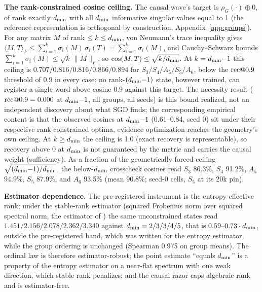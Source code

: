 \textbf{The rank-constrained cosine ceiling.} The causal wave's target
is $\rho_G(\cdot) \oplus 0$, of rank exactly $d_{\min}$ with all $d_{\min}$
informative singular values equal to 1 (the reference representation is
orthogonal by construction, Appendix~\ref{app:groups}). For any matrix
$M$ of rank $\leq k \leq d_{\min}$, von Neumann's trace inequality gives
$\langle M, T\rangle_F \leq \sum_{i=1}^{k} \sigma_i(M)\,\sigma_i(T) =
\sum_{i=1}^{k} \sigma_i(M)$, and Cauchy--Schwarz bounds
$\sum_{i=1}^{k} \sigma_i(M) \leq \sqrt{k}\,\lVert M \rVert_F$, so
$\cos(M, T) \leq \sqrt{k/d_{\min}}$. At $k = d_{\min}{-}1$ this ceiling is
$0.707/0.816/0.816/0.866/0.894$ for $S_3/S_4/A_5/S_5/A_6$, below the
$\mathrm{rec}@0.9$ threshold of 0.9 in every case: no rank-$(d_{\min}{-}1)$
state, however trained, can register a single word above cosine 0.9
against this target. The necessity result ($\mathrm{rec}@0.9 = 0.000$ at
$d_{\min}{-}1$, all groups, all seeds) is this bound realized, not an
independent discovery about what SGD finds; the corresponding empirical
content is that the observed cosines at $d_{\min}{-}1$ (0.61--0.84, seed 0) sit
under their respective rank-constrained optima, evidence optimization
reaches the geometry's own ceiling. At $k \geq d_{\min}$ the ceiling is
1.0 (exact recovery is representable), so recovery above 0 at $d_{\min}$
is not guaranteed by the metric and carries the causal weight
(sufficiency).
As a fraction of the geometrically forced ceiling
$\sqrt{(d_{\min}{-}1)/d_{\min}}$, the below-$d_{\min}$ crosscheck cosines read
$S_3$ 86.3\%, $S_4$ 91.2\%, $A_5$ 94.9\%, $S_5$ 87.9\%, and $A_6$
93.5\% (mean 90.8\%; seed-0 cells, $S_5$ at its 20k pin).

\textbf{Estimator dependence.} The pre-registered instrument is the
entropy effective rank; under the stable-rank estimator (squared
Frobenius norm over squared spectral norm, the estimator of
\citet{nazari2026rank}) the same unconstrained states read
$1.451/2.156/2.078/2.362/3.340$ against $d_{\min} = 2/3/3/4/5$, that is
$0.59$--$0.73 \cdot d_{\min}$, outside the pre-registered band, which was
written for the entropy estimator, while the group ordering is
unchanged (Spearman 0.975 on group means). The ordinal law is therefore
estimator-robust; the point estimate ``equals $d_{\min}$'' is a property
of the entropy estimator on a near-flat spectrum with one weak
direction, which stable rank penalizes; and the causal razor caps
algebraic rank and is estimator-free.

